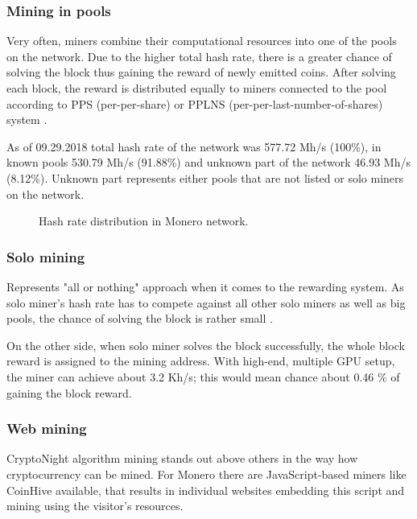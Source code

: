 \documentclass[
  printed, %
  table,   %
  lof,     %
  lot,     %
           oneside, color
]{fithesis3}
\begin{document}
\subsubsection{Mining in pools}
\label{cha:poolmining}
Very often, miners combine their computational resources into one of the pools on the network. Due to the higher total hash rate, there is a greater chance of solving the block thus gaining the reward of newly emitted coins. After solving each block, the reward is distributed equally to miners connected to the pool according to PPS (per-per-share) or PPLNS (per-per-last-number-of-shares) system \cite{tarasiewicz2015cryptocurrencies}.

As of 09.29.2018 total hash rate of the network was 577.72 Mh/s (100\%), in known pools 530.79 Mh/s (91.88\%) and unknown part of the network 46.93 Mh/s (8.12\%). Unknown part represents either pools that are not listed or solo miners on the network.


\begin{figure}[H]
\begin{center}
     \end{center}
      \caption{Hash rate distribution in Monero network.}
      \label{chart:range}

\end{figure}
\subsubsection{Solo mining}
\label{cha:solomining}
Represents "all or nothing" approach when it comes to the rewarding system. As solo miner's hash rate has to compete against all other solo miners as well as big pools, the chance of solving the block is rather small \cite{cong2018decentralized}.

On the other side, when solo miner solves the block successfully, the whole block reward is assigned to the mining address. With high-end, multiple GPU setup, the miner can achieve about 3.2 Kh/s; this would mean chance about 0.46 \% of gaining the block reward. 

\subsubsection{Web mining}
\label{cha:webmining}
CryptoNight algorithm mining stands out above others in the way how cryptocurrency can be mined. For Monero there are JavaScript-based miners like CoinHive available, that results in individual websites embedding this script and mining using the visitor's resources. 
\end{document}
